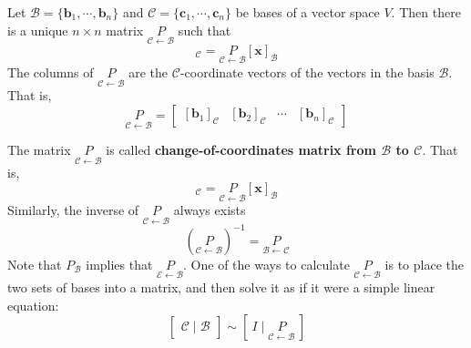 \begin{Thm}
    Let $\mathcal{B} = \{\mathbf{b}_1, \cdots, \mathbf{b}_n\}$ and $\mathcal{C} = \{\mathbf{c}_1, \cdots, \mathbf{c}_n\}$ be bases of a vector space $V$. Then there is a unique $n\times n$ matrix $\underset{\mathcal{C} \leftarrow \mathcal{B}}{P}$ such that
    \begin{equation*}
        [\mathbf{x}]_{\mathcal{C}} = \underset{\mathcal{C} \leftarrow \mathcal{B}}{P}[\mathbf{x}]_{\mathcal{B}}
    \end{equation*}
    The columns of $\underset{\mathcal{C} \leftarrow \mathcal{B}}{P}$ are the $\mathcal{C}$-coordinate vectors of the vectors in the basis $\mathcal{B}$. That is,
    \begin{equation*}
        \underset{\mathcal{C} \leftarrow \mathcal{B}}{P} = \begin{bmatrix}
            [\mathbf{b}_1]_{\mathcal{C}} & [\mathbf{b}_2]_{\mathcal{C}} & \cdots & [\mathbf{b}_n]_{\mathcal{C}}
        \end{bmatrix}
    \end{equation*}
\end{Thm}
The matrix $\underset{\mathcal{C} \leftarrow \mathcal{B}}{P}$ is called \textbf{change-of-coordinates matrix from $\mathcal{B}$ to $\mathcal{C}$}.
 That is,
 \begin{equation*}
     [\mathbf{x}]_{\mathcal{C}} = \underset{\mathcal{C} \leftarrow \mathcal{B}}{P} [\mathbf{x}]_{\mathcal{B}}
 \end{equation*}
Similarly, the inverse of $\underset{\mathcal{C} \leftarrow \mathcal{B}}{P}$ always exists
\begin{equation*}
    (\underset{\mathcal{C} \leftarrow \mathcal{B}}{P})^{-1} = \underset{\mathcal{B} \leftarrow \mathcal{C}}{P}
\end{equation*}
Note that $P_{\mathcal{B}}$ implies that $\underset{\mathcal{E} \leftarrow \mathcal{B}}{P}$.
One of the ways to calculate $\underset{\mathcal{C} \leftarrow \mathcal{B}}{P}$ is to place the two sets of bases into a matrix, and then solve it as if it were a simple linear equation:
\begin{equation*}
    \begin{bmatrix}
        \mathcal{C} \mid  \mathcal{B} 
    \end{bmatrix}\sim [\ 
        I \mid \underset{\mathcal{C} \leftarrow \mathcal{B}}{P}\ 
    ]
\end{equation*}
